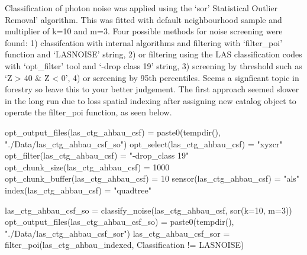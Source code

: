 \documentclass[
]{article}
\newenvironment{Shaded}{\begin{snugshade}}{\end{snugshade}}
\newcommand{\AttributeTok}[1]{\textcolor[rgb]{0.77,0.63,0.00}{#1}}
\newcommand{\DecValTok}[1]{\textcolor[rgb]{0.00,0.00,0.81}{#1}}
\newcommand{\FunctionTok}[1]{\textcolor[rgb]{0.00,0.00,0.00}{#1}}
\newcommand{\NormalTok}[1]{#1}
\newcommand{\OtherTok}[1]{\textcolor[rgb]{0.56,0.35,0.01}{#1}}
\newcommand{\SpecialCharTok}[1]{\textcolor[rgb]{0.00,0.00,0.00}{#1}}
\newcommand{\StringTok}[1]{\textcolor[rgb]{0.31,0.60,0.02}{#1}}
\begin{document}
Classification of photon noise was applied using the `sor' Statistical
Outlier Removal' algorithm. This was fitted with default neighbourhood
sample and multiplier of k=10 and m=3. Four possible methods for noise
screening were found: 1) classifcation with internal algorithms and
filtering with `filter\_poi' function and `LASNOISE' string, 2) or
filtering using the LAS classification codes with `opt\_filter' tool and
`-drop class 19' string, 3) screening by threshold such as `Z
\textgreater{} 40 \& Z \textless{} 0', 4) or screening by 95th
percentiles. Seems a signficant topic in forestry so leave this to your
better judgement. The first approach seemed slower in the long run due
to loss spatial indexing after assigning new catalog object to operate
the filter\_poi function, as seen below.

\begin{Shaded}
\begin{Highlighting}[]
\FunctionTok{opt\_output\_files}\NormalTok{(las\_ctg\_ahbau\_csf) }\OtherTok{=} \FunctionTok{paste0}\NormalTok{(}\FunctionTok{tempdir}\NormalTok{(), }\StringTok{"./Data/las\_ctg\_ahbau\_csf\_so"}\NormalTok{)}
\FunctionTok{opt\_select}\NormalTok{(las\_ctg\_ahbau\_csf) }\OtherTok{=} \StringTok{"xyzcr"}
\FunctionTok{opt\_filter}\NormalTok{(las\_ctg\_ahbau\_csf) }\OtherTok{=} \StringTok{"{-}drop\_class 19"}
\FunctionTok{opt\_chunk\_size}\NormalTok{(las\_ctg\_ahbau\_csf) }\OtherTok{=} \DecValTok{1000}
\FunctionTok{opt\_chunk\_buffer}\NormalTok{(las\_ctg\_ahbau\_csf) }\OtherTok{=} \DecValTok{10}
\FunctionTok{sensor}\NormalTok{(las\_ctg\_ahbau\_csf) }\OtherTok{=} \StringTok{"als"}
\FunctionTok{index}\NormalTok{(las\_ctg\_ahbau\_csf) }\OtherTok{=} \StringTok{"quadtree"}

\NormalTok{las\_ctg\_ahbau\_csf\_so }\OtherTok{=} \FunctionTok{classify\_noise}\NormalTok{(las\_ctg\_ahbau\_csf, }\FunctionTok{sor}\NormalTok{(}\AttributeTok{k=}\DecValTok{10}\NormalTok{, }\AttributeTok{m=}\DecValTok{3}\NormalTok{))}
\FunctionTok{opt\_output\_files}\NormalTok{(las\_ctg\_ahbau\_csf\_so) }\OtherTok{=} \FunctionTok{paste0}\NormalTok{(}\FunctionTok{tempdir}\NormalTok{(), }\StringTok{"./Data/las\_ctg\_ahbau\_csf\_sor"}\NormalTok{)}
\NormalTok{las\_ctg\_ahbau\_csf\_sor }\OtherTok{=} \FunctionTok{filter\_poi}\NormalTok{(las\_ctg\_ahbau\_indexed, Classification }\SpecialCharTok{!=}\NormalTok{ LASNOISE)}


\end{Highlighting}
\end{Shaded}
\end{document}
